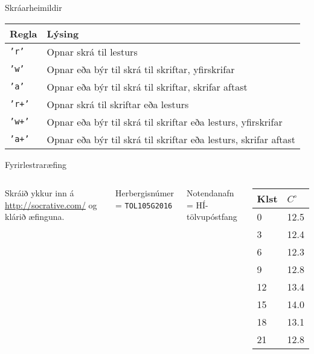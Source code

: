 \documentclass{beamer}
\begin{document}
\begin{frame}{Skráarheimildir}
\begin{center}
\begin{tabular}{ll}
\toprule
Regla&Lýsing\\
\midrule
\texttt{'r'}&Opnar skrá til lesturs\\
\texttt{'w'}&Opnar eða býr til skrá til skriftar, yfirskrifar\\
\texttt{'a'}&Opnar eða býr til skrá til skriftar, skrifar aftast\\
\texttt{'r+'}&Opnar skrá til skriftar eða lesturs\\
\texttt{'w+'}&Opnar eða býr til skrá til skriftar eða lesturs, yfirskrifar\\
\texttt{'a+'}&Opnar eða býr til skrá til skriftar eða lesturs, skrifar aftast\\
\bottomrule
\end{tabular}

\end{center}

\end{frame}

\begin{frame}[fragile]{Fyrirlestraræfing}
\begin{columns}
Skráið ykkur inn á \url{http://socrative.com/} og klárið æfinguna.

Herbergisnúmer = \texttt{TOL105G2016}

Notendanafn = HÍ-tölvupóstfang
\begin{center}
\begin{tabular}{ll}
\toprule
Klst&$C^\circ$\\
\midrule
0&12.5\\
3&12.4\\
6&12.3\\
9&12.8\\
12&13.4\\
15&14.0\\
18&13.1\\
21&12.8\\
\bottomrule
\end{tabular}
\end{center}
\end{columns}
\end{frame}
\end{document}
